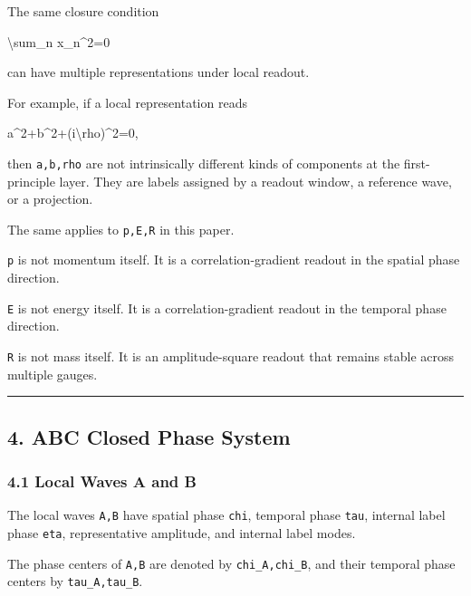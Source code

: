 \documentclass[
  a4paper,
]{article}
\newenvironment{Shaded}{}{}
\newcommand{\NormalTok}[1]{#1}
\begin{document}
The same closure condition

\begin{Shaded}
\begin{Highlighting}[]
\NormalTok{\textbackslash{}sum\_n x\_n\^{}2=0}
\end{Highlighting}
\end{Shaded}

can have multiple representations under local readout.

For example, if a local representation reads

\begin{Shaded}
\begin{Highlighting}[]
\NormalTok{a\^{}2+b\^{}2+(i\textbackslash{}rho)\^{}2=0,}
\end{Highlighting}
\end{Shaded}

then \texttt{a,b,rho} are not intrinsically different kinds of
components at the first-principle layer. They are labels assigned by a
readout window, a reference wave, or a projection.

The same applies to \texttt{p,E,R} in this paper.

\texttt{p} is not momentum itself. It is a correlation-gradient readout
in the spatial phase direction.

\texttt{E} is not energy itself. It is a correlation-gradient readout in
the temporal phase direction.

\texttt{R} is not mass itself. It is an amplitude-square readout that
remains stable across multiple gauges.

\begin{center}\rule{0.5\linewidth}{0.5pt}\end{center}

\subsection{4. ABC Closed Phase System}\label{abc-closed-phase-system}

\subsubsection{4.1 Local Waves A and B}\label{local-waves-a-and-b}

The local waves \texttt{A,B} have spatial phase \texttt{chi}, temporal
phase \texttt{tau}, internal label phase \texttt{eta}, representative
amplitude, and internal label modes.

The phase centers of \texttt{A,B} are denoted by \texttt{chi\_A,chi\_B},
and their temporal phase centers by \texttt{tau\_A,tau\_B}.
\end{document}
